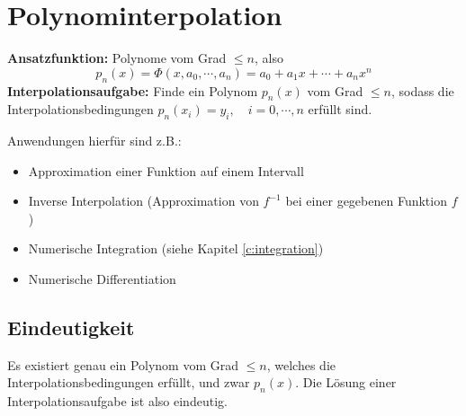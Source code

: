     \section{Polynominterpolation}
        \textbf{Ansatzfunktion:} Polynome vom Grad \( \leq n \), also
	    \begin{equation*}
		    p_n(x) = \Phi(x, a_0, \cdots, a_n) = a_0 + a_1 x + \cdots + a_n x^n
	    \end{equation*}
	    \textbf{Interpolationsaufgabe:} Finde ein Polynom \( p_n(x) \) vom Grad \( \leq n \), sodass die Interpolationsbedingungen \( p_n(x_i) = y_i, \quad i = 0, \cdots, n \) erfüllt sind.
	    
	    Anwendungen hierfür sind z.B.:
	    \begin{itemize}
	    	\item Approximation einer Funktion auf einem Intervall
	    	\item Inverse Interpolation (Approximation von \(f^{-1}\) bei einer gegebenen Funktion \(f\))
	    	\item Numerische Integration (siehe Kapitel \ref{c:integration})
	    	\item Numerische Differentiation
	    \end{itemize}

        \subsection{Eindeutigkeit}
            Es existiert genau ein Polynom vom Grad \( \leq n \), welches die Interpolationsbedingungen erfüllt, und zwar \(p_n(x)\). Die Lösung einer Interpolationsaufgabe ist also eindeutig.

